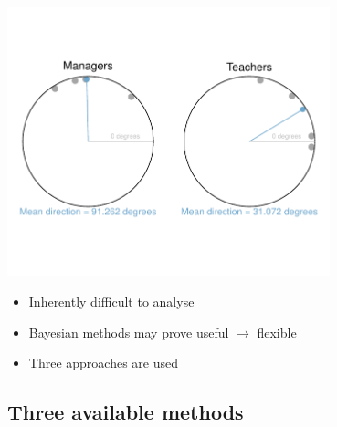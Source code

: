 \documentclass{beamer}
\begin{document}
\begin{frame}
\begin{center}

\includegraphics[width=0.7\textwidth, clip=true, trim=0.4cm 2cm 0.4cm 2cm]{ManagersTeachers.pdf}
\vspace{0.5cm}

\begin{itemize}
\item Inherently difficult to analyse
\pause
\item Bayesian methods may prove useful $\rightarrow$ flexible
\pause
\item Three approaches are used
\end{itemize}

\end{center}
\end{frame}

\subsection{Three available methods}
\end{document}
